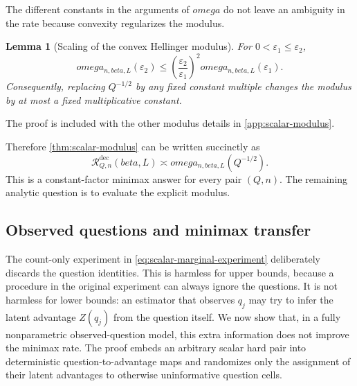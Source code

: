 \documentclass[11pt]{article}
\def\beta{beta}%
\def\omega{omega}%
\newtheorem{lemma}[theorem]{Lemma}
\newcommand{\calR}{\mathcal R}
\newcommand{\eps}{\varepsilon}
\begin{document}
The different constants in the arguments of $\omega$ do not leave an ambiguity in the rate because convexity regularizes the modulus.

\begin{lemma}[Scaling of the convex Hellinger modulus]
\label{lem:modulus-scaling}
For $0<\eps_1\le\eps_2$,
\begin{equation}
\label{eq:modulus-scaling}
\omega_{n,\beta,L}(\eps_2)
\le
\left(\frac{\eps_2}{\eps_1}\right)^2
\omega_{n,\beta,L}(\eps_1).
\end{equation}
Consequently, replacing $Q^{-1/2}$ by any fixed constant multiple changes the modulus by at most a fixed multiplicative constant.
\end{lemma}
The proof is included with the other modulus details in \cref{app:scalar-modulus}.

Therefore \cref{thm:scalar-modulus} can be written succinctly as
\begin{equation}
\label{eq:scalar-modulus-succinct}
\boxed{
\calR^{\mathrm{dec}}_{Q,n}(\beta,L)
\asymp
\omega_{n,\beta,L}(Q^{-1/2}).
}
\end{equation}
This is a constant-factor minimax answer for every pair $(Q,n)$.  The remaining analytic question is to evaluate the explicit modulus.

\subsection{Observed questions and minimax transfer}
\label{sec:observed-transfer}

The count-only experiment in \eqref{eq:scalar-marginal-experiment} deliberately discards the question identities.  This is harmless for upper bounds, because a procedure in the original experiment can always ignore the questions.  It is not harmless for lower bounds: an estimator that observes $q_j$ may try to infer the latent advantage $Z(q_j)$ from the question itself.  We now show that, in a fully nonparametric observed-question model, this extra information does not improve the minimax rate.  The proof embeds an arbitrary scalar hard pair into deterministic question-to-advantage maps and randomizes only the assignment of their latent advantages to otherwise uninformative question cells.
\end{document}
